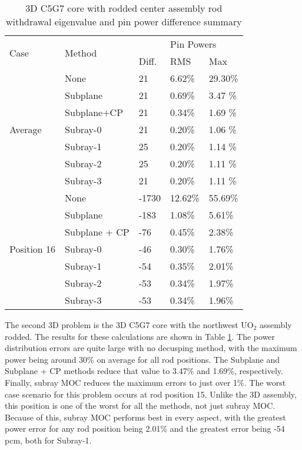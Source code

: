 \begin{table}[h]
    \centering
    \caption[3D C5G7 Core with Rodded Center Assembly Results]{3D C5G7 core with rodded center assembly rod withdrawal eigenvalue and pin power difference summary}\label{t:c5g7-3d-core-center}
    \begin{tabular}{l l l l l}\toprule
        \multirow{2}{*}{Case} & \multirow{2}{*}{Method} & \keff{} & \multicolumn{2}{l}{Pin Powers} \\
        & & Diff. & RMS & Max \\\midrule
        \multirow{7}{*}{Average} & None        & 21 & 6.62\% & 29.30\% \\
        & Subplane    & 21 & 0.69\% & 3.47 \% \\
        & Subplane+CP & 21 & 0.34\% & 1.69 \% \\
        & Subray-0    & 21 & 0.20\% & 1.06 \% \\
        & Subray-1    & 25 & 0.20\% & 1.14 \% \\
        & Subray-2    & 25 & 0.20\% & 1.11 \% \\
        & Subray-3    & 21 & 0.20\% & 1.11 \% \\
        \midrule
        \multirow{7}{*}{Position 16} & None          & -1730 & 12.62\% & 55.69\% \\
        & Subplane      & -183 & 1.08\% & 5.61\% \\
        & Subplane + CP & -76 & 0.45\% & 2.38\% \\
        & Subray-0      & -46 & 0.30\% & 1.76\% \\
        & Subray-1      & -54 & 0.35\% & 2.01\% \\
        & Subray-2      & -53 & 0.34\% & 1.97\% \\
        & Subray-3      & -53 & 0.34\% & 1.96\% \\
        \bottomrule
    \end{tabular}
\end{table}

The second 3D problem is the 3D C5G7 core with the northwest UO$_2$ assembly rodded.  The results for these calculations are shown in Table \ref{t:c5g7-3d-core-center}.  The power distribution errors are quite large with no decusping method, with the maximum power being around 30\% on average for all rod positions.  The Subplane and Subplane + CP methods reduce that value to 3.47\% and 1.69\%, respectively.  Finally, subray MOC reduces the maximum errors to just over 1\%.  The worst case scenario for this problem occurs at rod position 15.  Unlike the 3D assembly, this position is one of the worst for all the methods, not just subray MOC.  Because of this, subray MOC performs best in every aspect, with the greatest power error for any rod position being 2.01\% and the greatest \keff{} error being -54 pcm, both for Subray-1.

